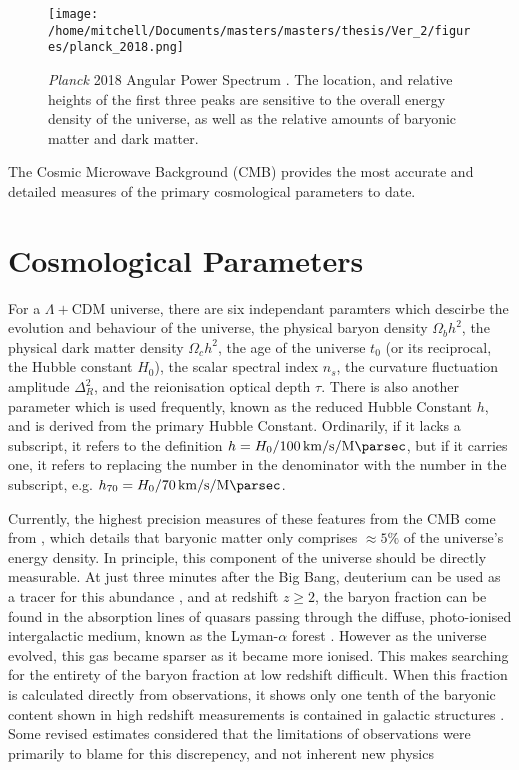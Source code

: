 \begin{figure}[h!]
\centering
\texttt{[image: /home/mitchell/Documents/masters/masters/thesis/Ver\_2/figures/planck\_2018.png]}
\caption{\emph{Planck} 2018 Angular Power Spectrum \citep{2018arXiv180706209P}. The location, and relative heights of the first three peaks are sensitive to the overall energy density of the universe, as well as the relative amounts of baryonic matter and dark matter.}
\end{figure}

The Cosmic Microwave Background (CMB) provides the most accurate and detailed measures of the primary cosmological parameters to date. 

\section{Cosmological Parameters}
For a $\Lambda+$CDM universe, there are six independant paramters which descirbe the evolution and behaviour of the universe, the physical baryon density $\Omega_b h^2$, the physical dark matter density $\Omega_c h^2$, the age of the universe $t_0$ (or its reciprocal, the Hubble constant $H_0$), the scalar spectral index $n_s$, the curvature fluctuation amplitude $\Delta_R^2$, and the reionisation optical depth $\tau$. There is also another parameter which is used frequently, known as the reduced Hubble Constant $h$, and is derived from the primary Hubble Constant. Ordinarily, if it lacks a subscript, it refers to the definition $h = H_0/\SI{100}{\kilo\meter\per\second\per\mega\parsec}$, but if it carries one, it refers to replacing the number in the denominator with the number in the subscript, e.g. $h_{70} = H_0/\SI{70}{\kilo\meter\per\second\per\mega\parsec}$.

Currently, the highest precision measures of these features from the CMB come from \cite{2018arXiv180706209P}, which details that baryonic matter only comprises $\approx 5 \% $ of the universe's energy density. In principle, this component of the universe should be directly measurable. At just three minutes after the Big Bang, deuterium can be used as a tracer for this abundance \citep{2007ARNPS..57..463S}, and at redshift $z \geqslant 2$, the baryon fraction can be found in the absorption lines of quasars passing through the diffuse, photo-ionised intergalactic medium, known as the Lyman-$\alpha$ forest \citep{1997ApJ...490..564W}. However as the universe evolved, this gas became sparser as it became more ionised. This makes searching for the entirety of the baryon fraction at low redshift difficult. When this fraction is calculated directly from observations, it shows only one tenth of the baryonic content shown in high redshift measurements is contained in galactic structures \citep{1992MNRAS.258P..14P}. Some revised estimates considered that the limitations of observations were primarily to blame for this discrepency, and not inherent new physics \citep{1994MNRAS.267...13B, 1998ApJ...503..518F}

